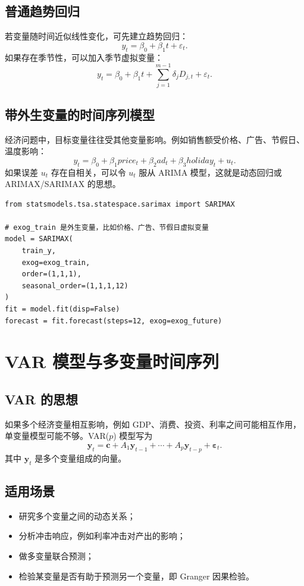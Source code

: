 \documentclass[11pt,a4paper]{ctexart}
\begin{document}
\subsection{普通趋势回归}
若变量随时间近似线性变化，可先建立趋势回归：
\[
y_t=\beta_0+\beta_1t+\varepsilon_t.
\]
如果存在季节性，可以加入季节虚拟变量：
\[
y_t=\beta_0+\beta_1t+\sum_{j=1}^{m-1}\delta_jD_{j,t}+\varepsilon_t.
\]

\subsection{带外生变量的时间序列模型}
经济问题中，目标变量往往受其他变量影响。例如销售额受价格、广告、节假日、温度影响：
\[
y_t=\beta_0+\beta_1 price_t+\beta_2 ad_t+\beta_3 holiday_t+u_t.
\]
如果误差 $u_t$ 存在自相关，可以令 $u_t$ 服从 ARIMA 模型，这就是动态回归或 ARIMAX/SARIMAX 的思想。

\begin{lstlisting}
from statsmodels.tsa.statespace.sarimax import SARIMAX

# exog_train 是外生变量，比如价格、广告、节假日虚拟变量
model = SARIMAX(
    train_y,
    exog=exog_train,
    order=(1,1,1),
    seasonal_order=(1,1,1,12)
)
fit = model.fit(disp=False)
forecast = fit.forecast(steps=12, exog=exog_future)
\end{lstlisting}

\section{VAR 模型与多变量时间序列}
\subsection{VAR 的思想}
如果多个经济变量相互影响，例如 GDP、消费、投资、利率之间可能相互作用，单变量模型可能不够。VAR($p$) 模型写为
\[
\bm y_t=\bm c+A_1\bm y_{t-1}+\cdots+A_p\bm y_{t-p}+\bm\varepsilon_t.
\]
其中 $\bm y_t$ 是多个变量组成的向量。

\subsection{适用场景}
\begin{itemize}
  \item 研究多个变量之间的动态关系；
  \item 分析冲击响应，例如利率冲击对产出的影响；
  \item 做多变量联合预测；
  \item 检验某变量是否有助于预测另一个变量，即 Granger 因果检验。
\end{itemize}
\end{document}
